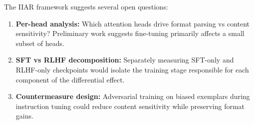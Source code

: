 \documentclass[11pt]{article}
\begin{document}
The IIAR framework suggests several open questions:

\begin{enumerate}
    \item \textbf{Per-head analysis:} Which attention heads drive format parsing vs content sensitivity? Preliminary work suggests fine-tuning primarily affects a small subset of heads.
    \item \textbf{SFT vs RLHF decomposition:} Separately measuring SFT-only and RLHF-only checkpoints would isolate the training stage responsible for each component of the differential effect.
    \item \textbf{Countermeasure design:} Adversarial training on biased exemplars during instruction tuning could reduce content sensitivity while preserving format gains.
\end{enumerate}
\end{document}
